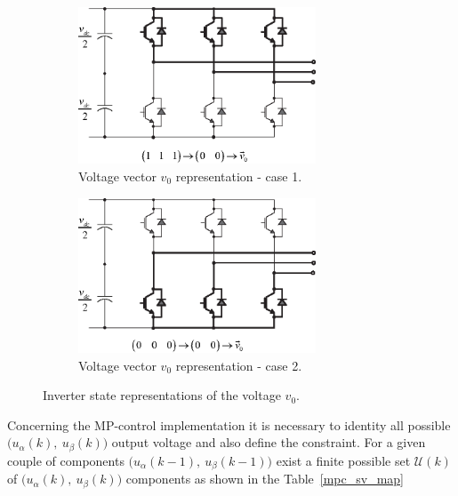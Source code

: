 \documentclass[11pt,a4paper,oneside]{book}
\numberwithin{equation}{section}
\theoremstyle{it}
\theoremstyle{definition}
\begin{document}
\begin{figure}[H]
	\centering
	\begin{subfigure}{0.5\textwidth}
		\centering
		\includegraphics[width = 200pt, angle = 0, 
		keepaspectratio]{figures/vector_modulator/space_vector_8.eps}
		\captionsetup{width=0.45\textwidth, font=footnotesize}	
		\caption{Voltage vector $v_0$ representation - case 1.}
		\label{space_vector_8}
	\end{subfigure}%
	\begin{subfigure}{0.5\textwidth}
		\centering
		\includegraphics[width = 200pt, angle = 0, 
		keepaspectratio]{figures/vector_modulator/space_vector_9.eps}
		\captionsetup{width=0.45\textwidth, font=footnotesize}	
		\caption{Voltage vector $v_0$ representation - case 2.}
		\label{space_vector_9}
	\end{subfigure}
	\captionsetup{width=0.5\textwidth, font=small}	
	\caption{Inverter state representations of the voltage $v_0$.}
	\label{space_vector_89}
\end{figure}


Concerning the MP-control implementation it is necessary to identity all 
possible $\Big(u_\alpha(k),\ u_\beta(k)\Big)$ output voltage and also define 
the constraint. For a given couple of components $\Big(u_\alpha(k-1),\ 
u_\beta(k-1)\Big)$ exist a finite possible set $\mathcal{U}(k)$ of 
$\Big(u_\alpha(k),\ u_\beta(k)\Big)$ components as shown in the 
Table~\ref{mpc_sv_map}
\end{document}

